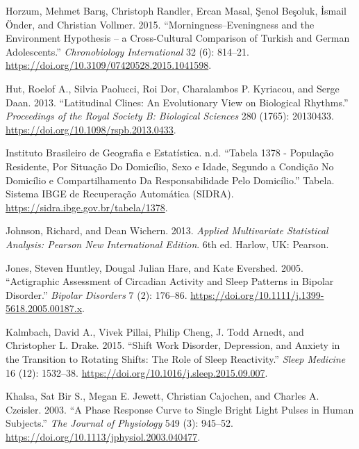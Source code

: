 \documentclass[
  12pt,
  a4paper,
  oneside]{tesesusp}
\newlength{\cslhangindent}
\newlength{\cslentryspacingunit} %
\newenvironment{CSLReferences}[2] %
 {%
  \setlength{\parindent}{0pt}
  \ifodd #1
  \let\oldpar\par
  \def\par{\hangindent=\cslhangindent\oldpar}
  \fi
  \setlength{\parskip}{#2\cslentryspacingunit}
 }%
 {}
\begin{document}
\begin{CSLReferences}{1}{0}
\leavevmode{}%
Horzum, Mehmet Barış, Christoph Randler, Ercan Masal, Şenol Beşoluk,
İsmail Önder, and Christian Vollmer. 2015. {``Morningness--Eveningness
and the Environment Hypothesis -- a Cross-Cultural Comparison of Turkish
and German Adolescents.''} \emph{Chronobiology International} 32 (6):
814--21. \url{https://doi.org/10.3109/07420528.2015.1041598}.

\leavevmode{}%
Hut, Roelof A., Silvia Paolucci, Roi Dor, Charalambos P. Kyriacou, and
Serge Daan. 2013. {``Latitudinal Clines: An Evolutionary View on
Biological Rhythms.''} \emph{Proceedings of the Royal Society B:
Biological Sciences} 280 (1765): 20130433.
\url{https://doi.org/10.1098/rspb.2013.0433}.

\leavevmode{}%
Instituto Brasileiro de Geografia e Estatística. n.d. {``Tabela 1378 -
População Residente, Por Situação Do Domicílio, Sexo e Idade, Segundo a
Condição No Domicílio e Compartilhamento Da Responsabilidade Pelo
Domicílio.''} Tabela. Sistema IBGE de Recuperação Automática (SIDRA).
\url{https://sidra.ibge.gov.br/tabela/1378}.

\leavevmode{}%
Johnson, Richard, and Dean Wichern. 2013. \emph{Applied Multivariate
Statistical Analysis: Pearson New International Edition}. 6th ed.
Harlow, UK: Pearson.

\leavevmode{}%
Jones, Steven Huntley, Dougal Julian Hare, and Kate Evershed. 2005.
{``Actigraphic Assessment of Circadian Activity and Sleep Patterns in
Bipolar Disorder.''} \emph{Bipolar Disorders} 7 (2): 176--86.
\url{https://doi.org/10.1111/j.1399-5618.2005.00187.x}.

\leavevmode{}%
Kalmbach, David A., Vivek Pillai, Philip Cheng, J. Todd Arnedt, and
Christopher L. Drake. 2015. {``Shift Work Disorder, Depression, and
Anxiety in the Transition to Rotating Shifts: The Role of Sleep
Reactivity.''} \emph{Sleep Medicine} 16 (12): 1532--38.
\url{https://doi.org/10.1016/j.sleep.2015.09.007}.

\leavevmode{}%
Khalsa, Sat Bir S., Megan E. Jewett, Christian Cajochen, and Charles A.
Czeisler. 2003. {``A Phase Response Curve to Single Bright Light Pulses
in Human Subjects.''} \emph{The Journal of Physiology} 549 (3): 945--52.
\url{https://doi.org/10.1113/jphysiol.2003.040477}.


\end{CSLReferences}
\end{document}

